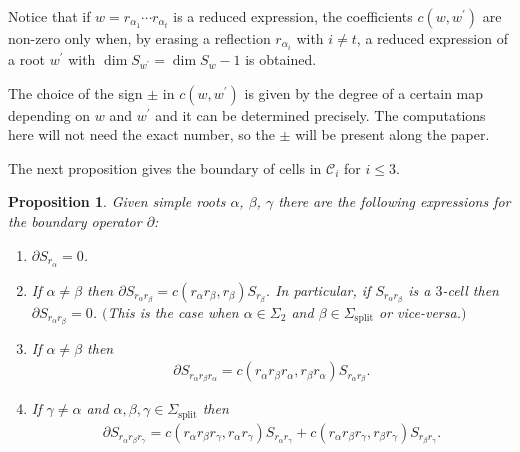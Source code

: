 \documentclass[pdftex]{sigma}
\numberwithin{equation}{section}
\newtheorem{Proposition}[Theorem]{Proposition}
 { \theoremstyle{definition}
\newtheorem{Definition}[Theorem]{Definition}
\newtheorem{Note}[Theorem]{Note}
\newtheorem{Example}[Theorem]{Example}
\newtheorem{Remark}[Theorem]{Remark} }
\begin{document}
Notice that if $w=r_{\alpha_1}\cdots r_{\alpha_t}$ is a reduced expression, the coefficients $c(w,w^{\prime })$ are non-zero only when, by erasing a reflection $r_{\alpha_i}$ with $i\neq t$, a reduced expression of a root $w^{\prime }$ with $\dim S_{w^{\prime }}=\dim S_w-1$ is obtained.

The choice of the sign $\pm $ in $c(w,w^{\prime })$ is given by the degree of a certain map depending on $w$ and $w^{\prime }$ \cite[Theorem~2.6]{RSM} and it can be determined precisely. The computations here will not need the exact number, so the $\pm $ will be present along the paper.

The next proposition gives the boundary of cells in $\mathcal C_i$ for $i\leq 3$.
\begin{Proposition}\label{pro.boundarymax}Given simple roots $\alpha$, $\beta$, $\gamma $ there are the following expressions for the boundary operator $\partial $:
\begin{enumerate}\itemsep=0pt
\item[$1.$] $\partial S_{r_{\alpha }}=0$.
\item[$2.$] If $\alpha \neq \beta $ then $\partial S_{r_{\alpha }r_{\beta }}=c( r_{\alpha }r_{\beta },r_{\beta}) S_{r_{\beta }}$. In particular, if $S_{r_{\alpha }r_{\beta }}$ is a $3$-cell then $\partial S_{r_{\alpha}r_{\beta }}=0$. $($This is the case when $\alpha \in \Sigma _{2}$ and $\beta\in \Sigma _{\mathrm{split}}$ or vice-versa.$)$
\item[$3.$] If $\alpha \neq \beta $ then
\begin{gather}
\partial S_{r_{\alpha }r_{\beta }r_{\alpha }}=c ( r_{\alpha }r_{\beta}r_{\alpha },r_{\beta }r_{\alpha } ) S_{r_{\alpha }r_{\beta }}.\label{eq.deltaSa}
\end{gather}
\item[$4.$] If $\gamma \neq \alpha $ and $\alpha,\beta,\gamma \in \Sigma _{\mathrm{split}}$ then
\begin{gather}
\partial S_{r_{\alpha }r_{\beta }r_{\gamma }}=c ( r_{\alpha }r_{\beta}r_{\gamma },r_{\alpha }r_{\gamma } ) S_{r_{\alpha }r_{\gamma}}+c ( r_{\alpha }r_{\beta }r_{\gamma },r_{\beta }r_{\gamma } )S_{r_{\beta }r_{\gamma }}. \label{eq.deltaSaba}
\end{gather}
\end{enumerate}
\end{Proposition}
\end{document}

